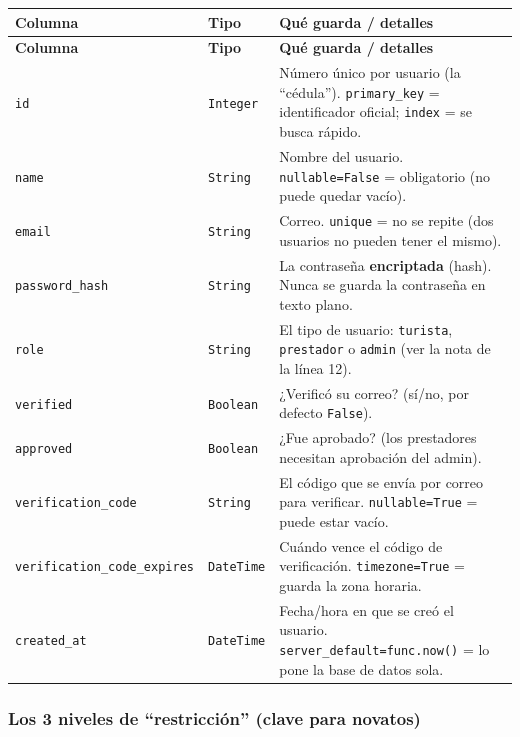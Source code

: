 \documentclass[11pt,a4paper]{article}
\begin{document}
\begin{center}
{\small
\setlength{\tabcolsep}{4pt}
\begin{longtable}{@{}>{\raggedright\arraybackslash}p{4.2cm}>{\raggedright\arraybackslash}p{3cm}>{\raggedright\arraybackslash}p{7.7cm}@{}}
\toprule
\textbf{Columna} & \textbf{Tipo} & \textbf{Qué guarda / detalles} \\
\midrule
\endfirsthead
\toprule
\textbf{Columna} & \textbf{Tipo} & \textbf{Qué guarda / detalles} \\
\midrule
\endhead
\texttt{id} & \texttt{Integer} & Número único por usuario (la ``cédula''). \texttt{primary\_key} = identificador oficial; \texttt{index} = se busca rápido. \\
\texttt{name} & \texttt{String} & Nombre del usuario. \texttt{nullable=False} = obligatorio (no puede quedar vacío). \\
\texttt{email} & \texttt{String} & Correo. \texttt{unique} = no se repite (dos usuarios no pueden tener el mismo). \\
\texttt{password\_hash} & \texttt{String} & La contraseña \textbf{encriptada} (hash). Nunca se guarda la contraseña en texto plano. \\
\texttt{role} & \texttt{String} & El tipo de usuario: \texttt{turista}, \texttt{prestador} o \texttt{admin} (ver la nota de la línea 12). \\
\texttt{verified} & \texttt{Boolean} & ¿Verificó su correo? (sí/no, por defecto \texttt{False}). \\
\texttt{approved} & \texttt{Boolean} & ¿Fue aprobado? (los prestadores necesitan aprobación del admin). \\
\texttt{verification\_code} & \texttt{String} & El código que se envía por correo para verificar. \texttt{nullable=True} = puede estar vacío. \\
\texttt{verification\_code\_\allowbreak expires} & \texttt{DateTime} & Cuándo vence el código de verificación. \texttt{timezone=True} = guarda la zona horaria. \\
\texttt{created\_at} & \texttt{DateTime} & Fecha/hora en que se creó el usuario. \texttt{server\_default=func.now()} = lo pone la base de datos sola. \\
\bottomrule
\end{longtable}
}
\end{center}

\subsubsection{Los 3 niveles de ``restricción'' (clave para novatos)}
\end{document}
